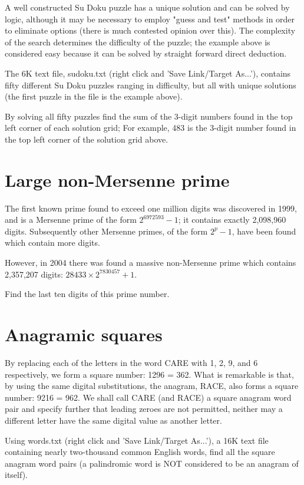 A well constructed Su Doku puzzle has a unique solution and can be solved by logic, although it may be necessary to employ "guess and test" methods in order to eliminate options (there is much contested opinion over this). The complexity of the search determines the difficulty of the puzzle; the example above is considered easy because it can be solved by straight forward direct deduction.

The 6K text file, sudoku.txt (right click and 'Save Link/Target As...'), contains fifty different Su Doku puzzles ranging in difficulty, but all with unique solutions (the first puzzle in the file is the example above).

By solving all fifty puzzles find the sum of the 3-digit numbers found in the top left corner of each solution grid; For example, 483 is the 3-digit number found in the top left corner of the solution grid above.

\section{Large non-Mersenne prime} \label{pb.097}

The first known prime found to exceed one million digits was discovered in 1999, and is a Mersenne prime of the form $2^{6972593}-1$; it contains exactly 2,098,960 digits. Subsequently other Mersenne primes, of the form $2^p-1$, have been found which contain more digits.

However, in 2004 there was found a massive non-Mersenne prime which contains 2,357,207 digits: $28433 \times 2^{7830457}+1$.

Find the last ten digits of this prime number.

\section{Anagramic squares} \label{pb.098}

By replacing each of the letters in the word CARE with 1, 2, 9, and 6 respectively, we form a square number: 1296 = 362. What is remarkable is that, by using the same digital substitutions, the anagram, RACE, also forms a square number: 9216 = 962. We shall call CARE (and RACE) a square anagram word pair and specify further that leading zeroes are not permitted, neither may a different letter have the same digital value as another letter.

Using words.txt (right click and 'Save Link/Target As...'), a 16K text file containing nearly two-thousand common English words, find all the square anagram word pairs (a palindromic word is NOT considered to be an anagram of itself).

